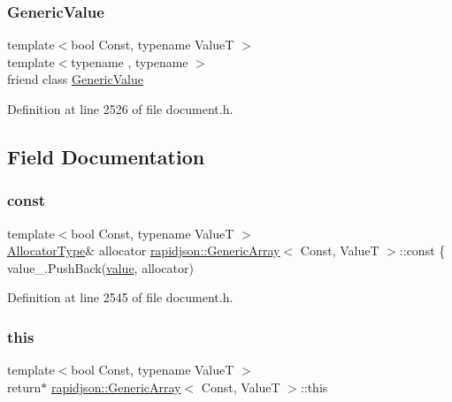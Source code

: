 \subsubsection{\texorpdfstring{GenericValue}{GenericValue}}
{\footnotesize\ttfamily template$<$bool Const, typename ValueT $>$ \\
template$<$typename , typename $>$ \\
friend class \mbox{\hyperlink{classrapidjson_1_1_generic_value}{Generic\+Value}}\hspace{0.3cm}{\ttfamily [friend]}}



Definition at line 2526 of file document.\+h.



\subsection{Field Documentation}
\mbox{\label{classrapidjson_1_1_generic_array_a363f892bf386776e236f5db273f2599f}} 
\subsubsection{\texorpdfstring{const}{const}}
{\footnotesize\ttfamily template$<$bool Const, typename ValueT $>$ \\
\mbox{\hyperlink{classrapidjson_1_1_generic_array_a82298d507b2b15c9d909c25a32f5afeb}{Allocator\+Type}}\& allocator \mbox{\hyperlink{classrapidjson_1_1_generic_array}{rapidjson\+::\+Generic\+Array}}$<$ Const, ValueT $>$\+::const \{ value\+\_\+.\+Push\+Back(\mbox{\hyperlink{namespacerapidjson_a1a75d60792094d496b500c40776030dd}{value}}, allocator)}



Definition at line 2545 of file document.\+h.

\mbox{\label{classrapidjson_1_1_generic_array_a21bef2fc4704ddcdced3966fd85904d2}} 
\subsubsection{\texorpdfstring{this}{this}}
{\footnotesize\ttfamily template$<$bool Const, typename ValueT $>$ \\
return$\ast$ \mbox{\hyperlink{classrapidjson_1_1_generic_array}{rapidjson\+::\+Generic\+Array}}$<$ Const, ValueT $>$\+::this}



